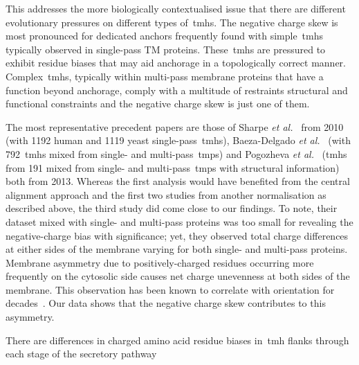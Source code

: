 \begin{enumerate}[i]
 This addresses the more biologically contextualised issue that there are different evolutionary pressures on different types of~\gls{tmh}s.
The negative charge skew is most pronounced for dedicated anchors frequently found with simple~\gls{tmh}s typically observed in single\--pass TM proteins.
These~\gls{tmh}s are pressured to exhibit residue biases that may aid anchorage in a topologically correct manner.
Complex~\gls{tmh}s, typically within multi\--pass membrane proteins that have a function beyond anchorage, comply with a multitude of restraints structural and functional constraints and the negative charge skew is just one of them.
\end{enumerate}

The most representative precedent papers are those of Sharpe \textit{et al.}~\cite{Sharpe2010} from 2010 (with 1192 human and 1119 yeast single\--pass~\gls{tmh}s), Baeza-Delgado \textit{et al.}~\cite{Baeza-Delgado2013} (with 792~\gls{tmh}s mixed from single- and multi\--pass~\gls{tmp}s) and Pogozheva \textit{et al.}~\cite{Pogozheva2013} (\gls{tmh}s from 191 mixed from single- and multi\--pass~\gls{tmp}s with structural information) both from 2013.
Whereas the first analysis would have benefited from the central alignment approach and the first two studies from another normalisation as described above, the third study did come close to our findings.
To note, their dataset mixed with single- and multi\--pass proteins was too small for revealing the negative\--charge bias with significance; yet, they observed total charge differences at either sides of the membrane varying for both single- and multi\--pass proteins.
Membrane asymmetry due to positively\--charged residues occurring more frequently on the cytosolic side causes net charge unevenness at both sides of the membrane.
This observation has been known to correlate with orientation for decades~\cite{VonHeijne1989, Baeza-Delgado2013, Meindl-Beinker2006}.
Our data shows that the negative charge skew contributes to this asymmetry.

There are differences in charged amino acid residue biases in~\gls{tmh} flanks through each stage of the secretory pathway


